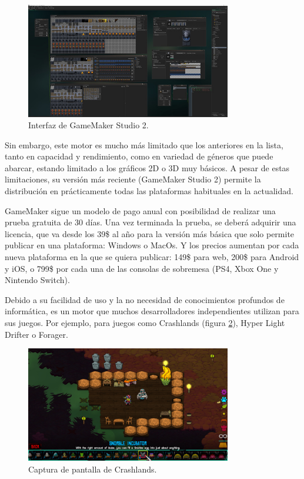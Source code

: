 \begin{figure}[H]
  \centering
\includegraphics[width=0.8\textwidth]{03.EstudioProblema/01.EstadoArte/00.Figuras/30.interfaz_game_maker.jpg}
    \caption{Interfaz de GameMaker Studio 2. \cite{EA_img_gameMaker}}
    \label{fig:EA_gameMaker}
\end{figure}

Sin embargo, este motor es mucho más limitado que los anteriores en la lista, tanto en capacidad y rendimiento, como en variedad de géneros que puede abarcar, estando limitado a los gráficos 2D o 3D muy básicos. A pesar de estas limitaciones, su versión más reciente (GameMaker Studio 2) permite la distribución en prácticamente todas las plataformas habituales en la actualidad.

GameMaker sigue un modelo de pago anual con posibilidad de realizar una prueba gratuita de 30 días. Una vez terminada la prueba, se deberá adquirir una licencia, que va desde los 39\$ al año para la versión más básica que solo permite publicar en una plataforma: Windows o MacOs. Y los precios aumentan por cada nueva plataforma en la que se quiera publicar: 149\$ para web, 200\$ para Android y iOS, o 799\$ por cada una de las consolas de sobremesa (PS4, Xbox One y Nintendo Switch).

Debido a su facilidad de uso y la no necesidad de conocimientos profundos de informática, es un motor que muchos desarrolladores independientes utilizan para sus juegos. Por ejemplo, para juegos como Crashlands (figura \ref{fig:EA_crashlands}), Hyper Light Drifter o Forager.



\begin{figure}
  \centering
\includegraphics[width=0.8\textwidth]{03.EstudioProblema/01.EstadoArte/00.Figuras/31.crashlands.jpg}
    \caption{Captura de pantalla de Crashlands. \cite{EA_img_crashlands}}
    \label{fig:EA_crashlands}
\end{figure}


